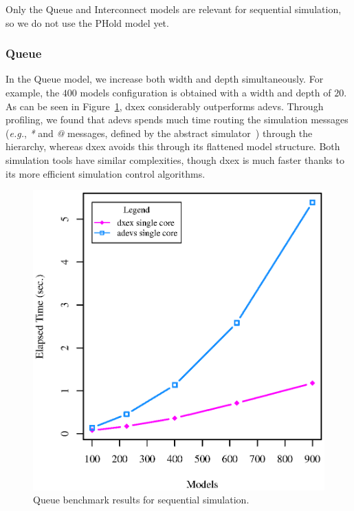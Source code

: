 Only the Queue and Interconnect models are relevant for sequential simulation, so we do not use the PHold model yet.

\vspace{0.1cm}

\subsubsection{Queue}
In the Queue model, we increase both width and depth simultaneously.
For example, the $400$ models configuration is obtained with a width and depth of $20$.
As can be seen in Figure~\ref{fig:Queue_benchmark}, dxex considerably outperforms adevs.
Through profiling, we found that adevs spends much time routing the simulation messages (\textit{e.g.}, \textit{*} and \textit{@} messages, defined by the abstract simulator~\cite{AbstractSimulator}) through the hierarchy, whereas dxex avoids this through its flattened model structure.
Both simulation tools have similar complexities, though dxex is much faster thanks to its more efficient simulation control algorithms.

\begin{figure}
    \center
	\includegraphics[width=\plotfraction\columnwidth]{fig/queue_sequential.eps}
	\caption{Queue benchmark results for sequential simulation.}
	\label{fig:Queue_benchmark}
\end{figure}

